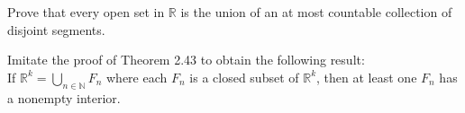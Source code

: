 \documentclass[12 pt, letterpaper]{hmcpset}
\begin{document}
\pagebreak

\begin{problem}[29.]
	Prove that every open set in $\mathbb{R}$ is the union of an at most countable collection of disjoint segments.
\end{problem}

\pagebreak

\begin{problem}[30.]
	Imitate the proof of Theorem 2.43 to obtain the following result: \\

	If $\mathbb{R}^{k} = \bigcup_{n \in \mathbb{N}} F_{n}$ where each $F_{n}$ is a closed subset of  $\mathbb{R}^{k}$, then at least one $F_{n}$ has a nonempty interior. \\
\end{problem}
\end{document}

